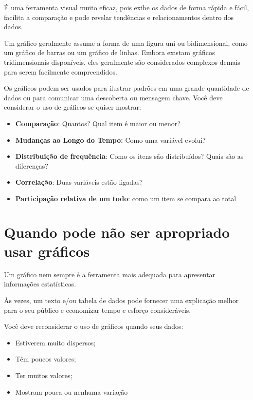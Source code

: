 É uma ferramenta visual muito eficaz, pois exibe os dados de forma rápida e fácil, facilita a comparação e pode revelar tendências e relacionamentos dentro dos dados.\vskip0.3cm  

Um gráfico geralmente assume a forma de uma figura uni ou bidimensional, como um gráfico de barras ou um gráfico de linhas. Embora existam gráficos tridimensionais disponíveis, eles geralmente são considerados complexos demais para serem facilmente compreendidos.\vskip0.3cm  

Os gráficos podem ser usados para ilustrar padrões em uma grande quantidade de dados ou para comunicar uma descoberta ou mensagem chave. Você deve considerar o uso de gráficos se quiser mostrar:

\begin{itemize}
    \item \textbf{Comparação}: Quantos? Qual item é maior ou menor?
    \item \textbf{Mudanças ao Longo do Tempo:} Como uma variável evolui?
    \item \textbf{Distribuição de frequência}: Como os itens são distribuídos? Quais são as diferenças?
    \item \textbf{Correlação}: Duas variáveis estão ligadas?
    \item \textbf{Participação relativa de um todo}: como um item se compara ao total
\end{itemize}

\newpage
\section{Quando pode não ser apropriado usar gráficos}

Um gráfico nem sempre é a ferramenta mais adequada para apresentar informações estatísticas. \vskip0.3cm

Às vezes, um texto e/ou tabela de dados pode fornecer uma explicação melhor para o seu público e economizar tempo e esforço consideráveis.\vskip0.3cm

Você deve reconsiderar o uso de gráficos quando seus dados: 

\begin{itemize}
\item Estiverem muito dispersos; 
\item Têm poucos valores; 
\item Ter muitos valores; 
\item Mostram pouca ou nenhuma variação
\end{itemize}

